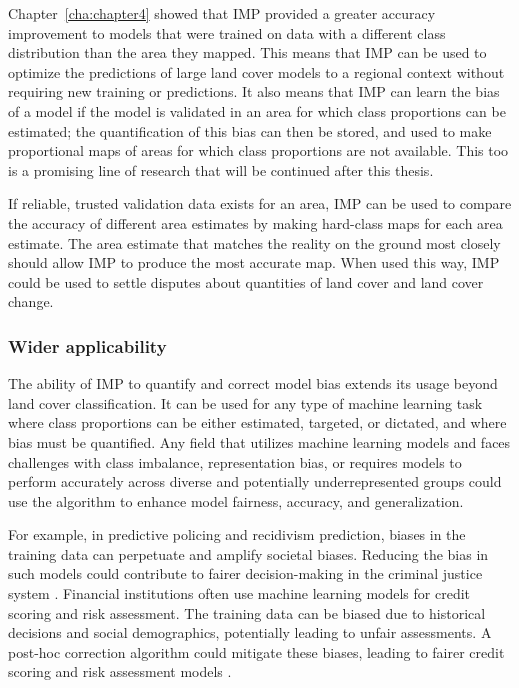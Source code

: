         Chapter\@~\ref{cha:chapter4} showed that IMP provided a greater accuracy improvement to models that were trained on data with a different class distribution than the area they mapped. This means that IMP can be used to optimize the predictions of large land cover models to a regional context without requiring new training or predictions. It also means that IMP can learn the bias of a model if the model is validated in an area for which class proportions can be estimated; the quantification of this bias can then be stored, and used to make proportional maps of areas for which class proportions are not available. This too is a promising line of research that will be continued after this thesis. 

        If reliable, trusted validation data exists for an area, IMP can be used to compare the accuracy of different area estimates by making hard-class maps for each area estimate. The area estimate that matches the reality on the ground most closely should allow IMP to produce the most accurate map. When used this way, IMP could be used to settle disputes about quantities of land cover and land cover change.

        \subsubsection{Wider applicability}
        
        The ability of IMP to quantify and correct model bias extends its usage beyond land cover classification. It can be used for any type of machine learning task where class proportions can be either estimated, targeted, or dictated, and where bias must be quantified. Any field that utilizes machine learning models and faces challenges with class imbalance, representation bias, or requires models to perform accurately across diverse and potentially underrepresented groups could use the algorithm to enhance model fairness, accuracy, and generalization.
        
        For example, in predictive policing and recidivism prediction, biases in the training data can perpetuate and amplify societal biases. Reducing the bias in such models could contribute to fairer decision-making in the criminal justice system \citep{berk2021fairness, dressel2018accuracy}. Financial institutions often use machine learning models for credit scoring and risk assessment. The training data can be biased due to historical decisions and social demographics, potentially leading to unfair assessments. A post-hoc correction algorithm could mitigate these biases, leading to fairer credit scoring and risk assessment models \citep{chen2018why, kamiran2012data}. 

